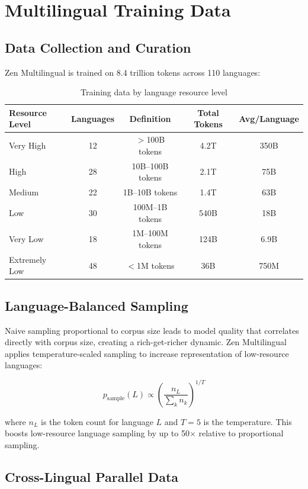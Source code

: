 \documentclass[11pt,a4paper]{article}
\begin{document}
\section{Multilingual Training Data}

\subsection{Data Collection and Curation}

Zen Multilingual is trained on 8.4 trillion tokens across 110 languages:

\begin{table}[H]
\centering
\caption{Training data by language resource level}
\label{tab:data}
\begin{tabular}{lcccc}
\toprule
Resource Level & Languages & Definition & Total Tokens & Avg/Language \\
\midrule
Very High & 12 & $>$100B tokens & 4.2T & 350B \\
High & 28 & 10B--100B tokens & 2.1T & 75B \\
Medium & 22 & 1B--10B tokens & 1.4T & 63B \\
Low & 30 & 100M--1B tokens & 540B & 18B \\
Very Low & 18 & 1M--100M tokens & 124B & 6.9B \\
Extremely Low & 48 & $<$1M tokens & 36B & 750M \\
\bottomrule
\end{tabular}
\end{table}

\subsection{Language-Balanced Sampling}

Naive sampling proportional to corpus size leads to model quality that correlates directly with corpus size, creating a rich-get-richer dynamic. Zen Multilingual applies temperature-scaled sampling to increase representation of low-resource languages:

\begin{equation}
p_{\text{sample}}(L) \propto \left(\frac{n_L}{\sum_k n_k}\right)^{1/T}
\end{equation}

where $n_L$ is the token count for language $L$ and $T = 5$ is the temperature. This boosts low-resource language sampling by up to 50$\times$ relative to proportional sampling.

\subsection{Cross-Lingual Parallel Data}
\end{document}
